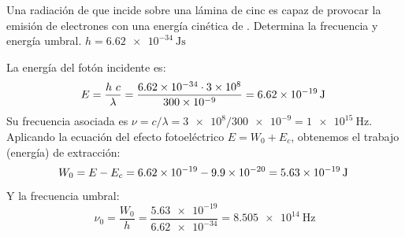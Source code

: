 
\begin{exercise}
    Una radiación de  que incide sobre una lámina de cinc es capaz de provocar la emisión de electrones con una energía cinética de . Determina la frecuencia y energía umbral.
    \datos{} \(h = \SI{6.62e-34}{\joule\s}\)

    \begin{solu}
        La energía del fotón incidente es:
        \begin{equation*}
            E = \dfrac{h\ c}{\lambda} = \dfrac{\num{6.62e-34}\cdot \num{3e8}}{\num{300e-9}} = \energia[j]{6.62e-19}
        \end{equation*}
        Su frecuencia asociada es \(\nu = c/\lambda = \num{3e8}/\num{300e-9} = \SI{1e15}{\hertz}\).
        Aplicando la ecuación del efecto fotoeléctrico \(E = W_0 + E_c\), obtenemos el trabajo (energía) de extracción:
        \begin{equation*}
            W_0 = E - E_c = \num{6.62e-19} - \num{9.9e-20} = \energia[j]{5.63e-19}
        \end{equation*}
        Y la frecuencia umbral:
        \begin{equation*}
            \nu_0 = \dfrac{W_0}{h} = \dfrac{\num{5.63e-19}}{\num{6.62e-34}} = \SI{8.505e14}{\hertz}
        \end{equation*}
    \end{solu}
\end{exercise}

